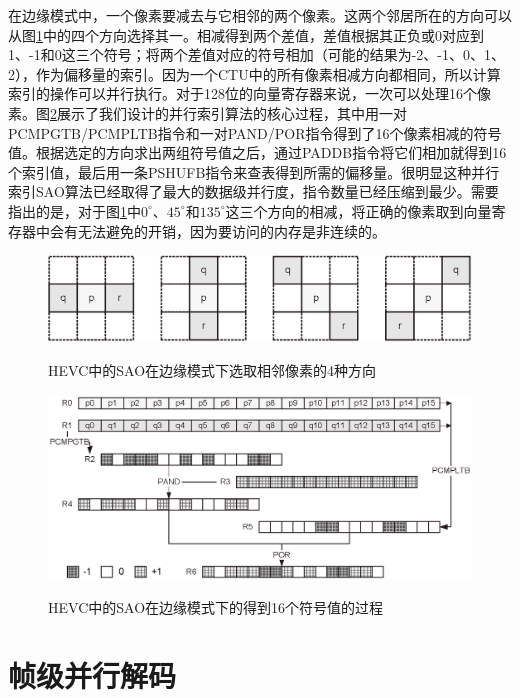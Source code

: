 在边缘模式中，一个像素要减去与它相邻的两个像素。这两个邻居所在的方向可以从图\ref{fig:SAO_edge_direction}中的四个方向选择其一。相减得到两个差值，差值根据其正负或0对应到1、-1和0这三个符号；将两个差值对应的符号相加（可能的结果为-2、-1、0、1、2），作为偏移量的索引。因为一个CTU中的所有像素相减方向都相同，所以计算索引的操作可以并行执行。对于128位的向量寄存器来说，一次可以处理16个像素。图\ref{fig:SAO_edge_parallel_index}展示了我们设计的并行索引算法的核心过程，其中用一对PCMPGTB/PCMPLTB指令和一对PAND/POR指令得到了16个像素相减的符号值。根据选定的方向求出两组符号值之后，通过PADDB指令将它们相加就得到16个索引值，最后用一条PSHUFB指令来查表得到所需的偏移量。很明显这种并行索引SAO算法已经取得了最大的数据级并行度，指令数量已经压缩到最少。需要指出的是，对于图\ref{fig:SAO_edge_direction}中$0^\circ$、$45^\circ$和$135^\circ$这三个方向的相减，将正确的像素取到向量寄存器中会有无法避免的开销，因为要访问的内存是非连续的。

\begin{figure}[!tp]
	\centering
	\includegraphics[width = 0.9\linewidth]{eps/SAO_edge_direction}\\
	\caption{\label{fig:SAO_edge_direction}HEVC中的SAO在边缘模式下选取相邻像素的4种方向}
\end{figure}

\begin{figure}[!tp]
	\centering
	\includegraphics[width = 0.95\linewidth]{eps/SAO_edge_parallel_index}\\
	\caption{\label{fig:SAO_edge_parallel_index}HEVC中的SAO在边缘模式下的得到16个符号值的过程}
\end{figure}


\section{帧级并行解码}

